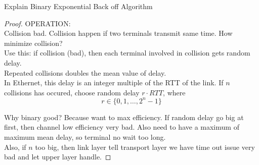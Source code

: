 \documentclass[../main.tex]{subfiles}
\begin{document}
\begin{wts}
    Explain Binary Exponential Back off Algorithm
\end{wts}
\begin{proof}
OPERATION:\\
Collision bad. Collision happen if two terminals transmit same time. How minimize collision? \\

Use this: if collision (bad), then each terminal involved in collision gets random delay. \\Repeated collisions doubles the mean value of delay.\\

In Ethernet, this delay is an integer multiple of the RTT of the link. If $n$ collisions has occured, choose random delay $r\cdot RTT$, where \[r\in \{0,1,\ldots, 2^n-1\}\]

Why binary good? Because want to max efficiency. If random delay go big at first, then channel low efficiency very bad. Also need to have a maximum of maximum mean delay, so terminal no wait too long.\\

Also, if $n$ too big, then link layer tell transport layer we have time out issue very bad and let upper layer handle.
\end{proof}\newpage
\end{document}
